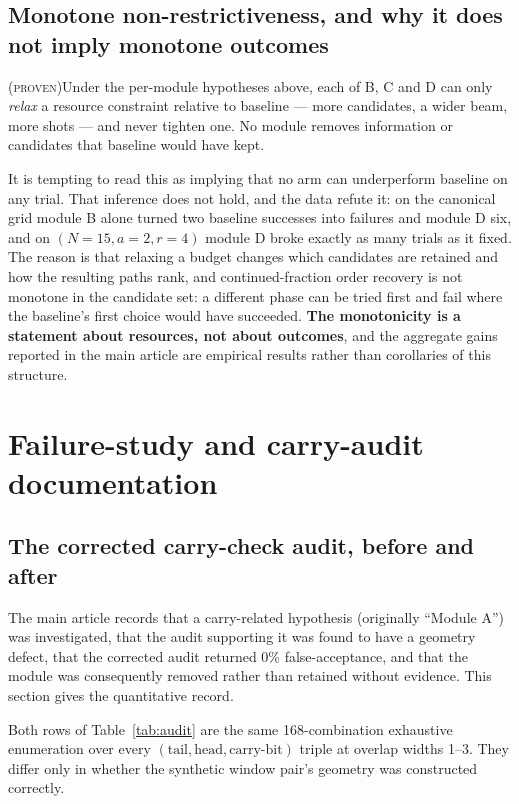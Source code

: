 \documentclass[preprint,11pt]{elsarticle}
\newcommand{\PROVEN}{\textsc{(proven)}}
\begin{document}
\subsection{Monotone non-restrictiveness, and why it does not imply monotone outcomes}
\PROVEN{}\quad Under the per-module hypotheses above, each of B, C and D
can only \emph{relax} a resource constraint relative to baseline --- more
candidates, a wider beam, more shots --- and never tighten one. No module
removes information or candidates that baseline would have kept.

It is tempting to read this as implying that no arm can underperform
baseline on any trial. That inference does not hold, and the data refute
it: on the canonical grid module B alone turned two baseline successes
into failures and module D six, and on $(N{=}15,a{=}2,r{=}4)$ module D
broke exactly as many trials as it fixed. The reason is that relaxing a
budget changes which candidates are retained and how the resulting paths
rank, and continued-fraction order recovery is not monotone in the
candidate set: a different phase can be tried first and fail where the
baseline's first choice would have succeeded. \textbf{The monotonicity is
a statement about resources, not about outcomes}, and the aggregate gains
reported in the main article are empirical results rather than corollaries
of this structure.

\section{Failure-study and carry-audit documentation}
\label{si:audit}

\subsection{The corrected carry-check audit, before and after}

The main article records that a carry-related hypothesis (originally
``Module A'') was investigated, that the audit supporting it was found to
have a geometry defect, that the corrected audit returned 0\%
false-acceptance, and that the module was consequently removed rather
than retained without evidence. This section gives the quantitative
record.

Both rows of Table~\ref{tab:audit} are the same 168-combination
exhaustive enumeration over every
$(\mathrm{tail},\mathrm{head},\text{carry-bit})$ triple at overlap widths
1--3. They differ only in whether the synthetic window pair's geometry
was constructed correctly.
\end{document}
